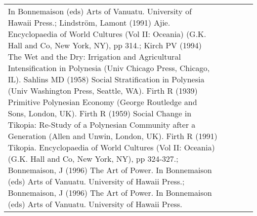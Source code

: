 \begin{longtable}{p{1.8cm}p{1.8cm}p{1.8cm}p{2cm}p{7cm}}
In Bonnemaison (eds) Arts of Vanuatu. University of Hawaii Press.; Lindström, Lamont (1991) Ajie. Encyclopaedia of World Cultures (Vol II: Oceania) (G.K. Hall and Co, New York, NY), pp 314.; Kirch PV (1994) The Wet and the Dry: Irrigation and Agricultural Intensification in Polynesia (Univ Chicago Press, Chicago, IL). Sahlins MD (1958) Social Stratification in Polynesia (Univ Washington Press, Seattle, WA). Firth R (1939) Primitive Polynesian Economy (George Routledge and Sons, London, UK). Firth R (1959) Social Change in Tikopia: Re-Study of a Polynesian Community after a Generation (Allen and Unwin, London, UK). Firth R (1991) Tikopia. Encyclopaedia of World Cultures (Vol II: Oceania) (G.K. Hall and Co, New York, NY), pp 324-327.; Bonnemaison, J (1996) The Art of Power. In Bonnemaison (eds) Arts of Vanuatu. University of Hawaii Press.; Bonnemaison, J (1996) The Art of Power. In Bonnemaison (eds) Arts of Vanuatu. University of Hawaii Press. \\ 

\end{longtable}
